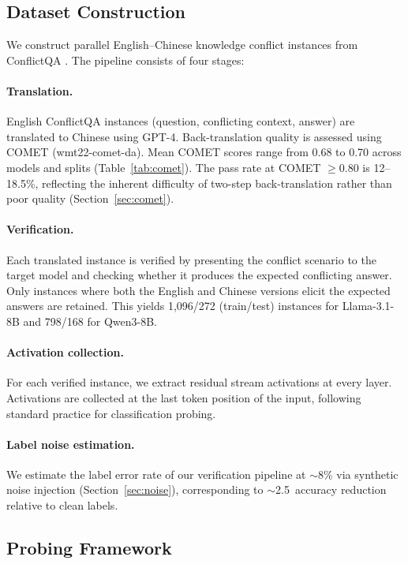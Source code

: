\documentclass[11pt]{article}
\newcommand{\pp}{\,\text{pp}}
\begin{document}
\subsection{Dataset Construction}

We construct parallel English--Chinese knowledge conflict instances from ConflictQA \citep{xie2024conflictqa}.
The pipeline consists of four stages:

\paragraph{Translation.}
English ConflictQA instances (question, conflicting context, answer) are translated to Chinese using GPT-4.
Back-translation quality is assessed using COMET (wmt22-comet-da).
Mean COMET scores range from 0.68 to 0.70 across models and splits (Table~\ref{tab:comet}).
The pass rate at COMET $\geq 0.80$ is 12--18.5\%, reflecting the inherent difficulty of two-step back-translation rather than poor quality (Section~\ref{sec:comet}).

\paragraph{Verification.}
Each translated instance is verified by presenting the conflict scenario to the target model and checking whether it produces the expected conflicting answer.
Only instances where both the English and Chinese versions elicit the expected answers are retained.
This yields 1,096/272 (train/test) instances for Llama-3.1-8B and 798/168 for Qwen3-8B.

\paragraph{Activation collection.}
For each verified instance, we extract residual stream activations at every layer.
Activations are collected at the last token position of the input, following standard practice for classification probing.

\paragraph{Label noise estimation.}
We estimate the label error rate of our verification pipeline at $\sim$8\% via synthetic noise injection (Section~\ref{sec:noise}), corresponding to $\sim$2.5\pp{} accuracy reduction relative to clean labels.

\subsection{Probing Framework}
\end{document}
